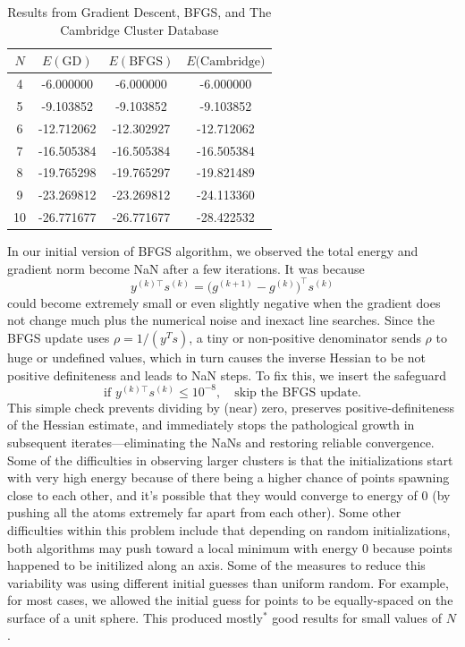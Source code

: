 \documentclass[11pt,onecolumn]{article}
\begin{document}
\begin{table}[h]
\centering
\begin{tabular}{|c|c|c|c|}
\hline
\(N\) & \(E(\mathrm{GD})\) & \(E(\mathrm{BFGS})\) & \(E(\mathrm{Cambridge)}\) \\ \hline
4  & -6.000000  & -6.000000  & -6.000000  \\ \hline
5  & -9.103852  & -9.103852  & -9.103852 \\ \hline
6  & -12.712062 & -12.302927 & -12.712062 \\ \hline
7  & -16.505384 & -16.505384 & -16.505384 \\ \hline
8  & -19.765298 & -19.765297 & -19.821489\\ \hline
9  & -23.269812 & -23.269812 & -24.113360\\ \hline
10 & -26.771677 & -26.771677 & -28.422532\\ \hline
\end{tabular}
\caption{Results from Gradient Descent, BFGS, and The Cambridge Cluster Database}
\end{table}

\noindent In our initial version of BFGS algorithm, we observed the total energy and gradient norm become NaN after a few iterations.  It was because  
\[
  y^{(k)\top}s^{(k)} 
  = \bigl(g^{(k+1)}-g^{(k)}\bigr)^\top s^{(k)}
\]
could become extremely small or even slightly negative when the gradient does not change much plus the numerical noise and inexact line searches.  Since the BFGS update uses  
\(\rho = 1/(y^Ts)\), a tiny or non‑positive denominator sends \(\rho\) to huge or undefined values, which in turn causes the inverse Hessian to be not positive definiteness and leads to NaN steps.  To fix this, we insert the safeguard  
\[
  \text{if }y^{(k)\top}s^{(k)} \le 10^{-8}, \quad\text{skip the BFGS update.}
\]
This simple check prevents dividing by (near) zero, preserves positive‑definiteness of the Hessian estimate, and immediately stops the pathological growth in subsequent iterates—eliminating the NaNs and restoring reliable convergence.  
\\

\noindent 
Some of the difficulties in observing larger clusters is that the initializations start with very high energy because of there being a higher chance of points spawning close to each other, and it's possible that they would converge to energy of 0 (by pushing all the atoms extremely far apart from each other). Some other difficulties within this problem include that depending on random initializations, both algorithms may push toward a local minimum with energy 0 because points happened to be initilized along an axis. Some of the measures to reduce this variability was using different initial guesses than uniform random. For example, for most cases, we allowed the initial guess for points to be equally-spaced on the surface of a unit sphere. This produced mostly$^*$ good results for small values of $N$.
\end{document}
